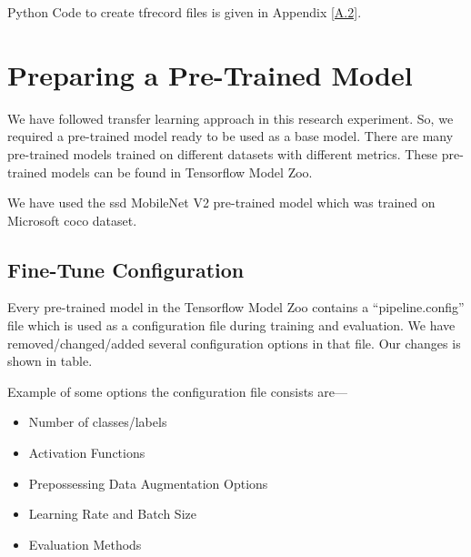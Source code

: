             Python Code to create \gls{tfrecord} files is given in Appendix \ref{A.2}.
            
    \section{Preparing a Pre-Trained Model}
        We have followed transfer learning approach in this research experiment. So, we required a pre-trained model ready to be used as a base model. There are many pre-trained models trained on different datasets with different metrics. These pre-trained models can be found in Tensorflow Model Zoo.
        
        We have used the \acrshort{ssd} MobileNet V2 pre-trained model which was trained on Microsoft \acrshort{coco} dataset.
        
        \subsection{Fine-Tune Configuration}
            Every pre-trained model in the Tensorflow Model Zoo contains a ``pipeline.config'' file which is used as a configuration file during training and evaluation. We have removed/changed/added several configuration options in that file. Our changes is shown in table.
            
            Example of some options the configuration file consists are---
            \begin{itemize}
                \item {Number of classes/labels}
                \item {Activation Functions}
                \item {Prepossessing Data Augmentation Options}
                \item {Learning Rate and Batch Size}
                \item {Evaluation Methods}
            \end{itemize}
